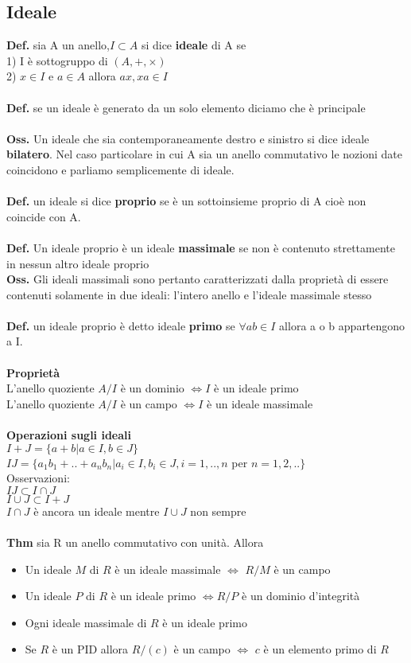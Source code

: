 \documentclass[10pt,a4paper]{article}
\begin{document}
\subsection{Ideale}
\textbf{Def.} sia A un anello,$I \subset A$ si dice \textbf{ideale} di A se\\
1) I è sottogruppo di $(A,+,\times)$\\
2) $x \in I$ e $a \in A$ allora $ax,xa \in I$\\\\
\textbf{Def.} se un ideale è generato da un solo elemento diciamo che è principale\\\\
\textbf{Oss.} Un ideale che sia contemporaneamente destro e sinistro si dice ideale \textbf{bilatero}. Nel caso particolare in cui A sia un anello commutativo le nozioni date coincidono e parliamo semplicemente di ideale.\\\\
\textbf{Def.} un ideale si dice \textbf{proprio} se è un sottoinsieme proprio di A cioè non coincide con A.\\\\
\textbf{Def.} Un ideale proprio è un ideale \textbf{massimale} se non è contenuto strettamente in nessun altro ideale proprio\\
\textbf{Oss.} Gli ideali massimali sono pertanto caratterizzati dalla proprietà di essere contenuti solamente in due ideali: l'intero anello e l'ideale massimale stesso\\\\
\textbf{Def.} un ideale proprio è detto ideale \textbf{primo} se $\forall ab \in I$ allora a o b appartengono a I.\\\\
\textbf{Proprietà}\\
L'anello quoziente $A/I$ è un dominio $\iff I$ è un ideale primo\\
L'anello quoziente $A/I$ è un campo $\iff I$ è un ideale massimale\\\\
\textbf{Operazioni sugli ideali}\\
$I+J = \{a+b|a \in I, b \in J\}$\\
$IJ = \{a_1b_1+..+a_n b_n| a_i \in I,b_i \in J,i=1,..,n$ per $n=1,2,..\}$\\
Osservazioni: \\
$IJ \subset I \cap J$\\ 
$I \cup J \subset I+J$\\
$I \cap J$ è ancora un ideale mentre $I \cup J$ non sempre\\\\
\textbf{Thm} sia R un anello commutativo con unità. Allora
\begin{itemize}
\item Un ideale $M$ di $R$ è un ideale massimale $\iff$ $R/M$ è un campo
\item Un ideale $P$ di $R$ è un ideale primo $\iff R/P$ è un dominio d'integrità
\item Ogni ideale massimale di $R$ è un ideale primo
\item Se $R$ è un PID allora $R/(c)$ è un campo $\iff$ $c$ è un elemento primo di $R$ 
\end{itemize}
\newpage
\end{document}
